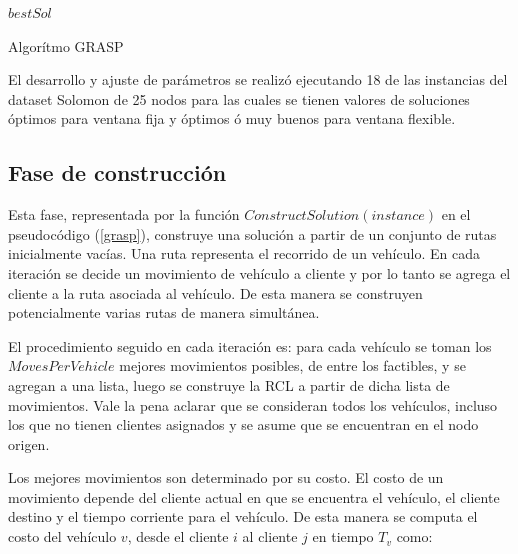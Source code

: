 \documentclass{article}
\begin{document}
  \begin{algorithm}
    \begin{algorithmic}
          \EndIf
            \EndIf
          \EndFor
          \EndIf
        \EndFor
        \State \Return $bestSol$
      \EndFunction
    \end{algorithmic}
    \caption{Algorítmo GRASP \label{grasp}}
  \end{algorithm}

  El desarrollo y ajuste de parámetros se realizó ejecutando 18 de las instancias del dataset Solomon de 25 nodos para las cuales se tienen valores de soluciones óptimos para ventana fija y óptimos ó muy buenos para ventana flexible.

  \subsection*{Fase de construcción}

  Esta fase, representada por la función $ConstructSolution(instance)$ en el pseudocódigo (\ref{grasp}), construye una solución a partir de un conjunto de rutas inicialmente vacías. Una ruta representa el recorrido de un vehículo. En cada iteración se decide un movimiento de vehículo a cliente y por lo tanto se agrega el cliente a la ruta asociada al vehículo. De esta manera se construyen potencialmente varias rutas de manera simultánea.

  El procedimiento seguido en cada iteración es: para cada vehículo se toman los $MovesPerVehicle$ mejores movimientos posibles, de entre los factibles, y se agregan a una lista, luego se construye la RCL a partir de dicha lista de movimientos. Vale la pena aclarar que se consideran todos los vehículos, incluso los que no tienen clientes asignados y se asume que se encuentran en el nodo origen.

  Los mejores movimientos son determinado por su costo. El costo de un movimiento depende del cliente actual en que se encuentra el vehículo, el cliente destino y el tiempo corriente para el vehículo. De esta manera se computa el costo del vehículo $v$, desde el cliente $i$ al cliente $j$ en tiempo $T_v$ como:
\end{document}
